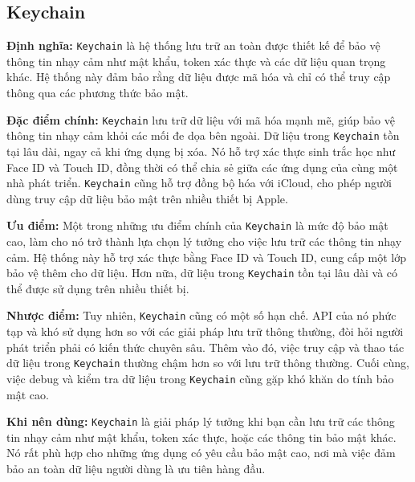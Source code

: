 \subsection{Keychain}
\textbf{Định nghĩa:} \texttt{Keychain} là hệ thống lưu trữ an toàn được thiết kế để bảo vệ thông tin nhạy cảm như mật khẩu, token xác thực và các dữ liệu quan trọng khác. Hệ thống này đảm bảo rằng dữ liệu được mã hóa và chỉ có thể truy cập thông qua các phương thức bảo mật.

\vspace{0.5em}

\textbf{Đặc điểm chính:} \texttt{Keychain} lưu trữ dữ liệu với mã hóa mạnh mẽ, giúp bảo vệ thông tin nhạy cảm khỏi các mối đe dọa bên ngoài. Dữ liệu trong \texttt{Keychain} tồn tại lâu dài, ngay cả khi ứng dụng bị xóa. Nó hỗ trợ xác thực sinh trắc học như Face ID và Touch ID, đồng thời có thể chia sẻ giữa các ứng dụng của cùng một nhà phát triển. \texttt{Keychain} cũng hỗ trợ đồng bộ hóa với iCloud, cho phép người dùng truy cập dữ liệu bảo mật trên nhiều thiết bị Apple.

\vspace{0.5em}

\textbf{Ưu điểm:} Một trong những ưu điểm chính của \texttt{Keychain} là mức độ bảo mật cao, làm cho nó trở thành lựa chọn lý tưởng cho việc lưu trữ các thông tin nhạy cảm. Hệ thống này hỗ trợ xác thực bằng Face ID và Touch ID, cung cấp một lớp bảo vệ thêm cho dữ liệu. Hơn nữa, dữ liệu trong \texttt{Keychain} tồn tại lâu dài và có thể được sử dụng trên nhiều thiết bị.

\vspace{0.5em}

\textbf{Nhược điểm:} Tuy nhiên, \texttt{Keychain} cũng có một số hạn chế. API của nó phức tạp và khó sử dụng hơn so với các giải pháp lưu trữ thông thường, đòi hỏi người phát triển phải có kiến thức chuyên sâu. Thêm vào đó, việc truy cập và thao tác dữ liệu trong \texttt{Keychain} thường chậm hơn so với lưu trữ thông thường. Cuối cùng, việc debug và kiểm tra dữ liệu trong \texttt{Keychain} cũng gặp khó khăn do tính bảo mật cao.

\vspace{0.5em}

\textbf{Khi nên dùng:} \texttt{Keychain} là giải pháp lý tưởng khi bạn cần lưu trữ các thông tin nhạy cảm như mật khẩu, token xác thực, hoặc các thông tin bảo mật khác. Nó rất phù hợp cho những ứng dụng có yêu cầu bảo mật cao, nơi mà việc đảm bảo an toàn dữ liệu người dùng là ưu tiên hàng đầu.